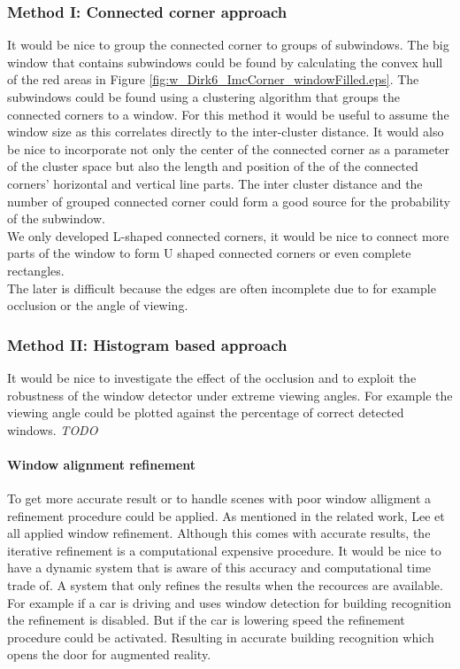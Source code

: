 \subsubsection{Method I: Connected corner approach} 

It would be nice to group the connected corner to groups of subwindows.
The big window that contains subwindows could be found by calculating the convex hull of the red areas in 
Figure \ref{fig:w_Dirk6_ImcCorner_windowFilled.eps}.
The subwindows could be found using a clustering algorithm that groups the connected corners to
a window. For this method it would be useful to assume the window size as this
correlates directly to the inter-cluster distance.
It would also be nice to incorporate not only the center of the connected corner
as a parameter of the cluster space but also the length and position of the of
the connected corners' horizontal and vertical line parts.  The inter cluster
distance and the number of grouped connected corner could form a good source for
the probability of the subwindow.\\

We only developed L-shaped connected corners, it would be nice to connect more
parts of the window to form U shaped connected corners or even complete rectangles.\\
The later is difficult because the edges are often incomplete due to for example occlusion 
or the angle of viewing.


\subsubsection{Method II: Histogram based approach} 
It would be nice to investigate the effect of the occlusion and to exploit the
robustness of the window detector under extreme viewing angles.
For example the viewing angle could be plotted against the percentage of
correct detected windows.
\emph{TODO}


\paragraph{Window alignment refinement}
To get more accurate result or to handle scenes with poor window alligment a refinement procedure could be applied.
As mentioned in the related work, Lee et all \cite{Lee_extraction} applied window refinement.
Although this comes with accurate results, the iterative refinement is a
computational expensive procedure. 
It would be nice to have a dynamic system that is aware of this 
accuracy and computational time trade of. A system that only refines the results when the recources are available.
For example if a car is driving and uses window detection for building recognition the refinement is disabled.
But if the car is lowering speed the refinement procedure could be activated.
Resulting in accurate building recognition which opens the door for augmented reality.

